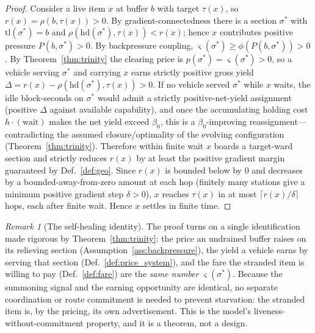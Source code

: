 \documentclass[11pt,twocolumn,a4paper]{article}
\theoremstyle{definition}
\theoremstyle{remark}
\newtheorem{remark}[theorem]{Remark}
\newcommand{\blocktime}{\beta_0}
\newcommand{\sep}{\varsigma}
\begin{document}
\begin{proof}
Consider a live item $x$ at buffer $b$ with target $\tau(x)$, so $r(x)=\rho(b,\tau(x))>0$. By gradient-connectedness there is a section $\sigma^\ast$ with $\mathrm{tl}(\sigma^\ast)=b$ and $\rho(\mathrm{hd}(\sigma^\ast),\tau(x)) < r(x)$; hence $x$ contributes positive pressure $P(b,\sigma^\ast)>0$. By backpressure coupling, $\sep(\sigma^\ast)\ge\phi(P(b,\sigma^\ast))>0$. By Theorem~\ref{thm:trinity} the clearing price is $p(\sigma^\ast)=\sep(\sigma^\ast)>0$, so a vehicle serving $\sigma^\ast$ and carrying $x$ earns strictly positive gross yield $\Delta = r(x)-\rho(\mathrm{hd}(\sigma^\ast),\tau(x))>0$. If no vehicle served $\sigma^\ast$ while $x$ waits, the idle block-seconds on $\sigma^\ast$ would admit a strictly positive-net-yield assignment (positive $\Delta$ against available capability), and once the accumulating holding cost $h\cdot(\text{wait})$ makes the net yield exceed $\blocktime$, this is a $\blocktime$-improving reassignment---contradicting the assumed closure/optimality of the evolving configuration (Theorem~\ref{thm:trinity}). Therefore within finite wait $x$ boards a target-ward section and strictly reduces $r(x)$ by at least the positive gradient margin guaranteed by Def.~\ref{def:geo}. Since $r(x)$ is bounded below by $0$ and decreases by a bounded-away-from-zero amount at each hop (finitely many stations give a minimum positive gradient step $\delta>0$), $x$ reaches $\tau(x)$ in at most $\lceil r(x)/\delta\rceil$ hops, each after finite wait. Hence $x$ settles in finite time.
\end{proof}

\begin{remark}[The self-healing identity]
The proof turns on a single identification made rigorous by Theorem~\ref{thm:trinity}: the price an undrained buffer raises on its relieving section (Assumption~\ref{ass:backpressure}), the yield a vehicle earns by serving that section (Def.~\ref{def:price_system}), and the fare the stranded item is willing to pay (Def.~\ref{def:fare}) are the \emph{same number} $\sep(\sigma^\ast)$. Because the summoning signal and the earning opportunity are identical, no separate coordination or route commitment is needed to prevent starvation: the stranded item is, by the pricing, its own advertisement. This is the model's liveness-without-commitment property, and it is a theorem, not a design.
\end{remark}
\end{document}
